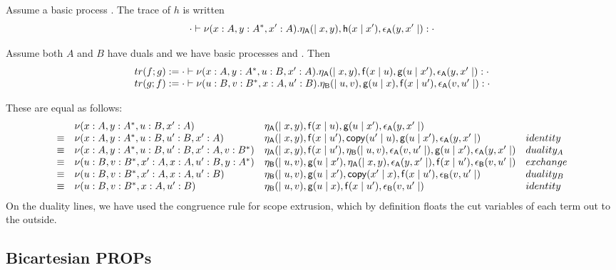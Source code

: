 \documentclass{article}
\newcommand\deq{\ensuremath{\equiv}}
\begin{document}
Assume a basic process .  The trace of $h$ is written
\[
\cdot \vdash \nu (x:A,y:A^*,x':A).\mathsf{\eta_A}( \mid x,y),\mathsf{h}(x \mid x'),\mathsf{\epsilon_A}(y,x' \mid ) : \cdot
\]

Assume both $A$ and $B$ have duals and we have basic processes
 and .
Then
\[
\begin{array}{l}
tr(f;g) := \cdot \vdash \nu (x:A,y:A^*,u:B,x':A).\mathsf{\eta_A}( \mid x,y),\mathsf{f}(x \mid u),\mathsf{g}(u \mid x'),\mathsf{\epsilon_A}(y,x' \mid ) : \cdot\\
tr(g;f) := \cdot \vdash \nu (u:B,v:B^*,x:A,u':B).\mathsf{\eta_B}( \mid u,v),\mathsf{g}(u \mid x),\mathsf{f}(x \mid u'),\mathsf{\epsilon_A}(v,u' \mid ) : \cdot
\end{array}
\]

These are equal as follows:
\[
\begin{array}{llll}
     & \nu {(x:A,y:A^*,u:B,x':A)} & {\const{\eta_A}{}{x,y},\const{f}{x}{u},\const{g}{u}{x'},\const{\epsilon_A}{y,x'}{}} \\
\deq & \nu {(x:A,y:A^*,u:B,u':B,x':A)} & {\const{\eta_A}{}{x,y},\const{f}{x}{u'},\cpy{u'}{u},\const{g}{u}{x'},\const{\epsilon_A}{y,x'}{}} & identity \\
\deq & \nu {(x:A,y:A^*,u:B,u':B,x':A,v:B^*)} & {\const{\eta_A}{}{x,y},\const{f}{x}{u'}, \const{\eta_B}{}{u,v},{\const{\epsilon_A}{v,u'}{}} ,\const{g}{u}{x'},\const{\epsilon_A}{y,x'}{}} & duality_A\\
\deq & \nu {(u:B,v:B^*,x':A,x:A,u':B,y:A^*)} & \const{\eta_B}{}{u,v},\const{g}{u}{x'},\const{\eta_A}{}{x,y},{\const{\epsilon_A}{y,x'}{}},\const{f}{x}{u'},\const{\epsilon_B}{v,u'}{} & exchange \\
\deq & \nu {(u:B,v:B^*,x':A,x:A,u':B)} & \const{\eta_B}{}{u,v},\const{g}{u}{x'},\cpy{x'}{x},\const{f}{x}{u'},\const{\epsilon_B}{v,u'}{} & duality_B \\
\deq & \nu {(u:B,v:B^*,x:A,u':B)} & {\const{\eta_B}{}{u,v},\const{g}{u}{x},\const{f}{x}{u'},\const{\epsilon_B}{v,u'}{}} & identity
\end{array}
\]
On the duality lines, we have used the congruence rule for scope
extrusion, which by definition floats the cut variables of each term out
to the outside.

\subsection{Bicartesian PROPs}
\end{document}

